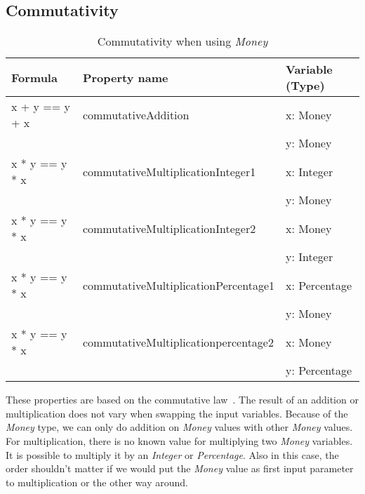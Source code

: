 \subsection*{Commutativity}
\label{ssct:4_commutativity}
\FloatBarrier
\begin{table}[!ht]
\centering
\begin{tabular}{lll}
\hline
                        \textbf{Formula} & \textbf{Property name}               & \textbf{Variable (Type)} \\ \hline
\rowcolor[HTML]{EFEFEF} x + y == y + x   & commutativeAddition                  & x: Money                 \\
\rowcolor[HTML]{EFEFEF}                  &                                      & y: Money                 \\
                        x * y == y * x   & commutativeMultiplicationInteger1    & x: Integer               \\
                                         &                                      & y: Money                 \\
\rowcolor[HTML]{EFEFEF} x * y == y * x   & commutativeMultiplicationInteger2    & x: Money                 \\
\rowcolor[HTML]{EFEFEF}                  &                                      & y: Integer               \\
                        x * y == y * x   & commutativeMultiplicationPercentage1 & x: Percentage            \\
                                         &                                      & y: Money                 \\
\rowcolor[HTML]{EFEFEF} x * y == y * x   & commutativeMultiplicationpercentage2 & x: Money                 \\
\rowcolor[HTML]{EFEFEF}                  &                                      & y: Percentage            \\ \hline
\end{tabular}
\caption{Commutativity when using \textit{Money}}
\label{tbl:ch4_money_commutativity}
\end{table}
\FloatBarrier
These properties are based on the commutative law~\cite{baumgart1961axioms}. The result of an addition or multiplication does not vary when swapping the input variables. Because of the \textit{Money} type, we can only do addition on \textit{Money} values with other \textit{Money} values. For multiplication, there is no known value for multiplying two \textit{Money} variables. It is possible to multiply it by an \textit{Integer} or \textit{Percentage}. Also in this case, the order shouldn't matter if we would put the \textit{Money} value as first input parameter to multiplication or the other way around.


